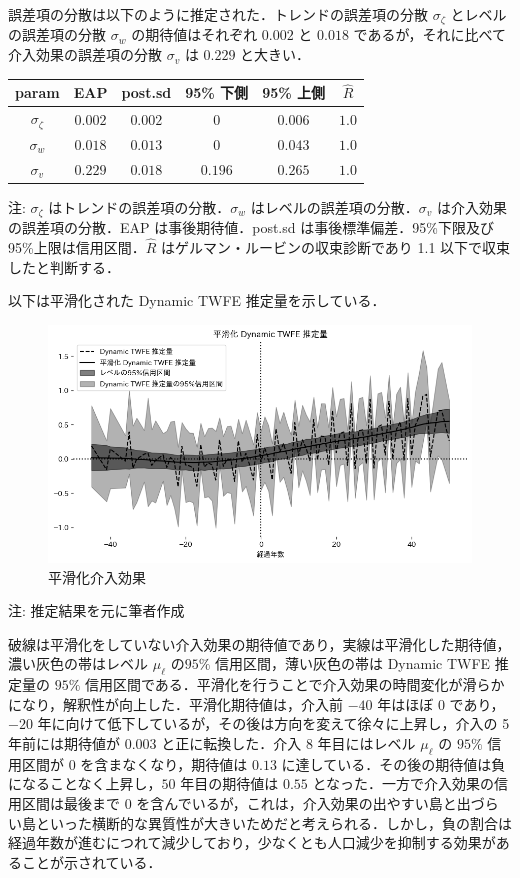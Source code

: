 誤差項の分散は以下のように推定された．トレンドの誤差項の分散
\(\sigma_{\zeta}\) とレベルの誤差項の分散 \(\sigma_{w}\)
の期待値はそれぞれ \(0.002\) と \(0.018\)
であるが，それに比べて介入効果の誤差項の分散 \(\sigma_{v}\) は \(0.229\)
と大きい．

\begin{longtable}[]{@{}cccccc@{}}
\toprule
param & EAP & post.sd & 95\% 下側 & 95\% 上側 &
\(\hat{R}\)\tabularnewline
\midrule
\endhead
\(\sigma_{\zeta}\) & \(0.002\) & \(0.002\) & \(0\) & \(0.006\) &
\(1.0\)\tabularnewline
\(\sigma_{w}\) & \(0.018\) & \(0.013\) & \(0\) & \(0.043\) &
\(1.0\)\tabularnewline
\(\sigma_{v}\) & \(0.229\) & \(0.018\) & \(0.196\) & \(0.265\) &
\(1.0\)\tabularnewline
\bottomrule
\end{longtable}

注: \(\sigma_{\zeta}\) はトレンドの誤差項の分散．\(\sigma_{w}\)
はレベルの誤差項の分散．\(\sigma_{v}\) は介入効果の誤差項の分散．EAP
は事後期待値．post.sd は事後標準偏差．95\%下限及び
95\%上限は信用区間．\(\hat{R}\) はゲルマン・ルービンの収束診断であり 1.1
以下で収束したと判断する．

以下は平滑化された Dynamic TWFE 推定量を示している．

\begin{figure}
\centering
\includegraphics{../figures/dynamic_twfe/smoothed_ATT.png}
\caption{平滑化介入効果}
\end{figure}

注: 推定結果を元に筆者作成

破線は平滑化をしていない介入効果の期待値であり，実線は平滑化した期待値，濃い灰色の帯はレベル
\(\mu_{\ell}\) の\(95\%\) 信用区間，薄い灰色の帯は Dynamic TWFE 推定量の
\(95\%\)
信用区間である．平滑化を行うことで介入効果の時間変化が滑らかになり，解釈性が向上した．平滑化期待値は，介入前
\(-40\) 年はほぼ \(0\) であり，\(-20\)
年に向けて低下しているが，その後は方向を変えて徐々に上昇し，介入の 5
年前には期待値が \(0.003\) と正に転換した．介入 \(8\) 年目にはレベル
\(\mu_{\ell}\) の \(95\%\) 信用区間が \(0\) を含まなくなり，期待値は
\(0.13\) に達している．その後の期待値は負になることなく上昇し，\(50\)
年目の期待値は \(0.55\) となった．一方で介入効果の信用区間は最後まで
\(0\)
を含んでいるが，これは，介入効果の出やすい島と出づらい島といった横断的な異質性が大きいためだと考えられる．しかし，負の割合は経過年数が進むにつれて減少しており，少なくとも人口減少を抑制する効果があることが示されている．

